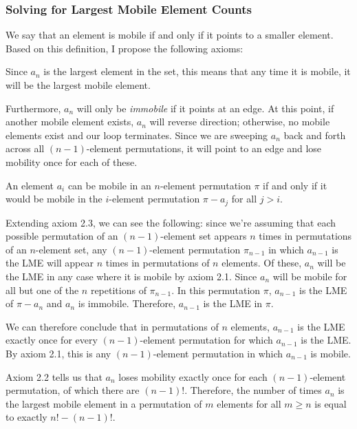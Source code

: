 \documentclass[10pt, oneside]{article}   	%
\begin{document}
\subsubsection{Solving for Largest Mobile Element Counts}

We say that an element is mobile if and only if it points to a smaller element. Based on this definition, I propose the following axioms:
\begin{axiom}
	Since $a_{n}$ is the largest element in the set, this means that any time it is mobile, it will be the largest mobile element.
\end{axiom}
\begin{axiom}
	Furthermore, $a_{n}$ will only be \emph{immobile} if it points at an edge. At this point, if another mobile element exists, $a_{n}$ will reverse direction; otherwise, no mobile elements exist and our loop terminates. Since we are sweeping $a_{n}$ back and forth across all $(n - 1)$-element permutations, it will point to an edge and lose mobility once for each of these.
\end{axiom}
\begin{axiom}
	An element $a_{i}$ can be mobile in an $n$-element permutation $\pi$ if and only if it would be mobile in the $i$-element permutation $\pi - a_{j}$ for all $j > i$.
\end{axiom}
Extending axiom 2.3, we can see the following: since we're assuming that each possible permutation of an $(n - 1)$-element set appears $n$ times in permutations of an $n$-element set, any $(n - 1)$-element permutation $\pi_{n - 1}$ in which $a_{n - 1}$ is the LME will appear $n$ times in permutations of $n$ elements. Of these, $a_{n}$ will be the LME in any case where it is mobile by axiom 2.1. Since $a_{n}$ will be mobile for all but one of the $n$ repetitions of $\pi_{n - 1}$. In this permutation $\pi$, $a_{n - 1}$ is the LME of $\pi - a_{n}$ and $a_{n}$ is immobile. Therefore, $a_{n - 1}$ is the LME in $\pi$.

We can therefore conclude that in permutations of $n$ elements, $a_{n - 1}$ is the LME exactly once for every $(n - 1)$-element permutation for which $a_{n - 1}$ is the LME. By axiom 2.1, this is any $(n - 1)$-element permutation in which $a_{n - 1}$ is mobile.

Axiom 2.2 tells us that $a_{n}$ loses mobility exactly once for each $(n - 1)$-element permutation, of which there are $(n - 1)!$. Therefore, the number of times $a_{n}$ is the largest mobile element in a permutation of $m$ elements for all $m \geq n$ is equal to exactly $n! - (n - 1)!$.
\end{document}
